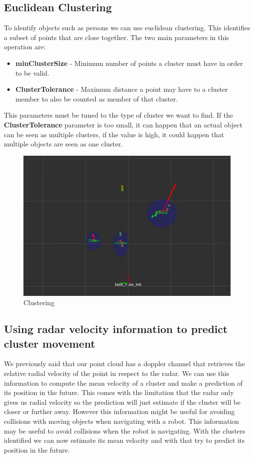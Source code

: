 \documentclass[12pt]{article}
\begin{document}
\subsection{Euclidean Clustering}
To identify objects such as persons we can use euclidean clustering. This identifies a subset of points that are close together. The two main parameters in this operation are:
\begin{itemize}
\item \textbf{minClusterSize} - Minimum number of points a cluster must have in order to be valid.
\item \textbf{ClusterTolerance}  - Maximum distance a point may have to a cluster member to also be counted as member of that cluster.
\end{itemize}
This parameters must be tuned to the type of cluster we want to find. 
If the \textbf{ClusterTolerance} parameter is too small, it can happen that an actual object can be seen as multiple clusters, if the value is high, it could happen that multiple objects are seen as one cluster.
\begin{figure}[!htb]
    \centering
    \includegraphics[width=\linewidth]{cluster.png}
    \caption{Clustering}
    \label{fig:clustering}
\end{figure}
\subsection{Using radar velocity information to predict cluster movement}
We previously said that our point cloud has a doppler channel that retrieves the relative radial velocity of the point in respect to the radar. We can use this information to compute the mean velocity of a cluster and make a prediction of its position in the future. This comes with the limitation that the radar only gives us radial velocity so the prediction will just estimate if the cluster will be closer or further away. However this information might be useful for avoiding collisions with moving objects when navigating with a robot.
This information may be useful to avoid collisions when the robot is navigating. 
With the clusters identified we can now estimate its mean velocity and with that try to predict its position in the future. 
\end{document}
